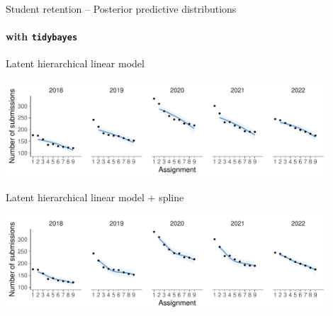 \documentclass[t]{beamer}
\begin{document}
\begin{frame}[fragile]{Student retention -- Posterior predictive distributions}
\framesubtitle{with \texttt{tidybayes}}
  
\vspace{-0.75\baselineskip}  
Latent hierarchical linear model\\  
  \hspace{-7mm}
  \begin{minipage}[t][3.6cm][t]{1.0\linewidth}
    \includegraphics[height=3.6cm]{student_retention_lbinom_preds.pdf}
  \end{minipage}
  
\vspace{-0.25\baselineskip}  
Latent hierarchical linear model + spline\\  
  \hspace{-7mm}
  \begin{minipage}[t][3.6cm][t]{1.0\linewidth}
  \includegraphics[height=3.6cm]{student_retention_sbinom_preds.pdf}
  \end{minipage}  

\end{frame}
\end{document}
